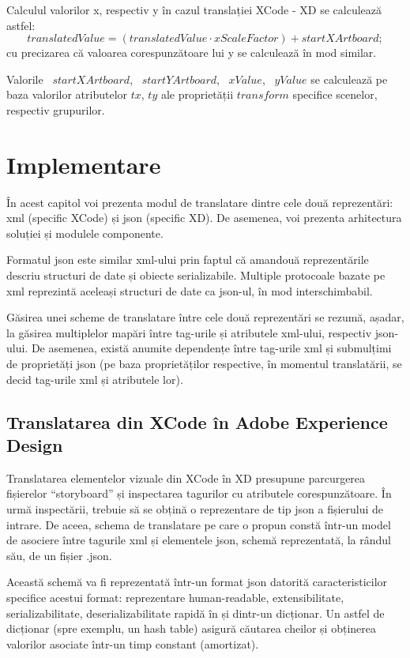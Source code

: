 Calculul valorilor x, respectiv y în cazul translației XCode - XD se calculează astfel:
        \[ translatedValue = ({translatedValue} \cdot{xScaleFactor}) + startXArtboard; \]
cu precizarea că valoarea corespunzătoare lui y se calculează în mod similar.

Valorile ~$startXArtboard$, ~$startYArtboard$, ~$xValue$, ~$yValue$ se calculează pe baza valorilor atributelor $tx$, $ty$ ale proprietății $transform$ specifice scenelor, respectiv grupurilor.

\chapter{Implementare}

În acest capitol voi prezenta modul de translatare dintre cele două reprezentări: xml (specific XCode) și json (specific XD). De asemenea, voi prezenta arhitectura soluției și modulele componente.

Formatul json este similar xml-ului prin faptul că amandouă reprezentările descriu structuri de date și obiecte serializabile. Multiple protocoale bazate pe xml reprezintă aceleași structuri de date ca json-ul, în mod interschimbabil.

Găsirea unei scheme de translatare între cele două reprezentări se rezumă, așadar, la găsirea multiplelor mapări între tag-urile și atributele xml-ului, respectiv json-ului. De asemenea, există anumite dependențe între tag-urile xml și submulțimi de proprietăți json (pe baza proprietăților respective, în momentul translatării, se decid tag-urile xml și atributele lor).

\section{Translatarea din XCode în Adobe Experience Design} \label{xcode2xdv1}

Translatarea elementelor vizuale din XCode în XD presupune parcurgerea fișierelor “storyboard” și inspectarea tagurilor cu atributele corespunzătoare. În urmă inspectării, trebuie să se obțină o reprezentare de tip json a fișierului de intrare.  De aceea, schema de translatare pe care o propun constă într-un model de asociere între tagurile xml și elementele json, schemă reprezentată, la rândul său, de un fișier .json.  

Această schemă va fi reprezentată într-un format json datorită caracteristicilor specifice acestui format: reprezentare human-readable, extensibilitate, serializabilitate, deserializabilitate rapidă în și dintr-un dicționar. Un astfel de dicționar (spre exemplu, un hash table) asigură căutarea cheilor și obținerea valorilor asociate într-un timp constant (amortizat).

